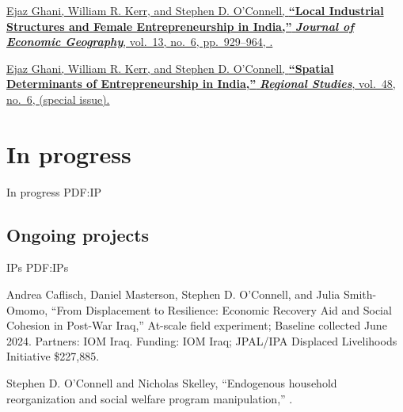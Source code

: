 \documentclass[letterpaper,10pt,oneside]{article}
\begin{document}
\begin{body}
\BigEntryGap

\href{http://www.stephenoconnell.org/files/Ghani_Kerr_OConnell_JEG13.pdf}
{Ejaz Ghani, William R. Kerr, and Stephen D. O'Connell,
\textbf{``Local Industrial Structures and Female Entrepreneurship in India,''}
\textbf{\textit{Journal of Economic Geography}},
vol.~13,
no.~6,
pp.~929--964,
.}

\BigEntryGapNoBreak

\href{http://www.stephenoconnell.org/files/Ghani_Kerr_OConnell_RS_2013.pdf}
{Ejaz Ghani, William R. Kerr, and Stephen D. O'Connell,
\textbf{``Spatial Determinants of Entrepreneurship in India,''}
\textbf{\textit{Regional Studies}},
vol.~48,
no.~6,
 (special issue).} 
 
\section
{In progress}
{In progress}
{PDF:IP}

\subsection
{Ongoing projects}
{IPs}
{PDF:IPs}

\EntryGapNoBreak
Andrea Caflisch, Daniel Masterson,  Stephen D. O'Connell, and Julia Smith-Omomo, ``From Displacement to Resilience: Economic Recovery Aid and Social Cohesion in Post-War Iraq,'' At-scale field experiment; Baseline collected June 2024. Partners: IOM Iraq. Funding: IOM Iraq; JPAL/IPA Displaced Livelihoods Initiative \$227,885.
 
\EntryGapNoBreak
Stephen D. O'Connell and Nicholas Skelley, ``Endogenous household reorganization and social welfare program manipulation,'' . 

 
 

\end{body}
\end{document}
